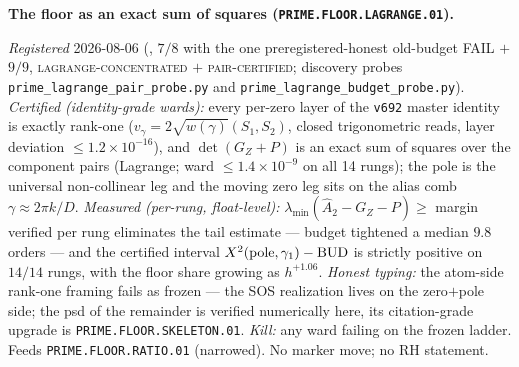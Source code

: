 \documentclass[11pt,a4paper]{article}
\begin{document}
\par\smallskip\noindent\textbf{The floor as an exact sum of
squares (\texttt{PRIME.FLOOR.LAGRANGE.01}).}
{\sloppy
\emph{Registered} 2026-08-06
(, $7/8$ with the one
preregistered-honest old-budget FAIL $+$ $9/9$,
\textsc{lagrange-concentrated} $+$ \textsc{pair-certified};
discovery probes \texttt{prime\_lagrange\_pair\_probe.py} and
\texttt{prime\_lagrange\_budget\_probe.py}).  \emph{Certified
(identity-grade wards):} every per-zero layer of the
\texttt{v692} master identity is exactly rank-one ($v_\gamma =
2\sqrt{w(\gamma)}(S_1, S_2)$, closed trigonometric reads, layer
deviation $\le1.2\times10^{-16}$), and $\det(G_Z+P)$ is an exact
sum of squares over the component pairs (Lagrange; ward
$\le1.4\times10^{-9}$ on all 14 rungs); the pole is the universal
non-collinear leg and the moving zero leg sits on the alias comb
$\gamma\approx2\pi k/D$.  \emph{Measured (per-rung, float-level):}
$\lambda_{\min}(\hat A_2 - G_Z - P)\ge$ margin verified per rung
eliminates the tail estimate --- budget tightened a median $9.8$
orders --- and the certified interval $X^2({\rm pole},\gamma_1) -
{\rm BUD}$ is strictly positive on $14/14$ rungs, with the
floor share growing as $h^{+1.06}$.  \emph{Honest typing:} the
atom-side rank-one framing fails as frozen --- the SOS
realization lives on the zero$+$pole side; the psd of the
remainder is verified numerically here, its citation-grade
upgrade is \texttt{PRIME.FLOOR.SKELETON.01}.  \emph{Kill:} any
ward failing on the frozen ladder.  Feeds
\texttt{PRIME.FLOOR.RATIO.01} (narrowed).  No marker move; no RH
statement.\par}
\end{document}

